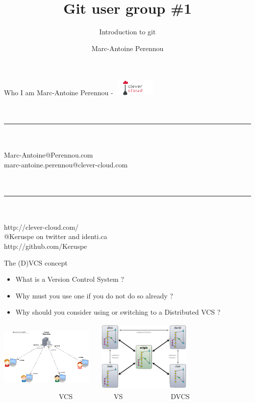 \documentclass{beamer}
\title{Git user group \#1}
\subtitle{Introduction to git}
\author[Keruspe]{Marc-Antoine Perennou}
\institute[CC]{Clever Cloud}
\date{}
\begin{document}
\begin{frame}[plain]
    \titlepage
\end{frame}

\begin{frame}{Who I am}
    Marc-Antoine Perennou - \includegraphics[width=80px,height=30px]{logo-cc.png} \\
    \ \\
    \ \\
    \hrule
    \ \\
    \ \\
    Marc-Antoine@Perennou.com \\
    marc-antoine.perennou@clever-cloud.com \\
    \ \\
    \ \\
    \hrule
    \ \\
    \ \\
    http://clever-cloud.com/ \\
    @Keruspe on twitter and identi.ca \\
    http://github.com/Keruspe
\end{frame}

\begin{frame}{The (D)VCS concept}
    \begin{itemize}
        \item What is a Version Control System ?
        \pause
        \item Why must you use one if you do not do so already ?
        \pause
        \item Why should you consider using or switching to a Distributed VCS ?
    \end{itemize}
    \includegraphics[width=130pt,height=100pt]{VCS.png} \ \vrule \ \
    \includegraphics[width=130pt,height=100pt]{DVCS.png} \\
    \ \ \ \ \ \ \ \ \ \ \ \ \ \ \ \ VCS\ \ \ \ \ \ \ \ \ \ \ \ VS\ \ \ \ \ \ \ \ \ \ \ \ \ \ DVCS
\end{frame}
\end{document}
